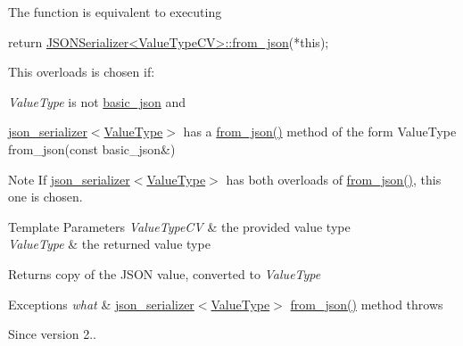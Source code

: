 The function is equivalent to executing 
\begin{DoxyCode}
\textcolor{keywordflow}{return} \hyperlink{namespacenlohmann_1_1detail_a1f0395aad0fe853a4539288749d3a603}{JSONSerializer<ValueTypeCV>::from\_json}(*\textcolor{keyword}{this});
\end{DoxyCode}


This overloads is chosen if\+:
\begin{DoxyItemize}
\item {\itshape Value\+Type} is not \hyperlink{classnlohmann_1_1basic__json}{basic\+\_\+json} and
\item \hyperlink{classnlohmann_1_1basic__json_ad6ebc5da7ced975bb184133750e7d49f}{json\+\_\+serializer$<$\+Value\+Type$>$} has a {\ttfamily \hyperlink{namespacenlohmann_1_1detail_aef5c8ea108f4d2b03fb4a635617510de}{from\+\_\+json()}} method of the form {\ttfamily Value\+Type from\+\_\+json(const basic\+\_\+json\&)}
\end{DoxyItemize}

\begin{DoxyNote}{Note}
If \hyperlink{classnlohmann_1_1basic__json_ad6ebc5da7ced975bb184133750e7d49f}{json\+\_\+serializer$<$\+Value\+Type$>$} has both overloads of {\ttfamily \hyperlink{namespacenlohmann_1_1detail_aef5c8ea108f4d2b03fb4a635617510de}{from\+\_\+json()}}, this one is chosen.
\end{DoxyNote}

\begin{DoxyTemplParams}{Template Parameters}
{\em Value\+Type\+CV} & the provided value type \\
\hline
{\em Value\+Type} & the returned value type\\
\hline
\end{DoxyTemplParams}
\begin{DoxyReturn}{Returns}
copy of the J\+S\+ON value, converted to {\itshape Value\+Type} 
\end{DoxyReturn}

\begin{DoxyExceptions}{Exceptions}
{\em what} & \hyperlink{classnlohmann_1_1basic__json_ad6ebc5da7ced975bb184133750e7d49f}{json\+\_\+serializer$<$\+Value\+Type$>$} {\ttfamily \hyperlink{namespacenlohmann_1_1detail_aef5c8ea108f4d2b03fb4a635617510de}{from\+\_\+json()}} method throws\\
\hline
\end{DoxyExceptions}
\begin{DoxySince}{Since}
version 2.. 
\end{DoxySince}
